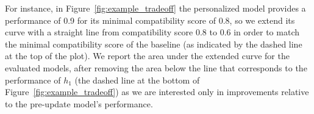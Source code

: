 \documentclass[letterpaper]{article} %
\theoremstyle{definition}
\begin{document}
For instance, in  Figure~\ref{fig:example_tradeoff} the personalized model provides a performance of 0.9 for its minimal compatibility score of 0.8, so we extend its curve with a straight line from compatibility score 0.8 to 0.6 in order to match the minimal compatibility score of the baseline (as indicated by the dashed line at the top of the plot). We report the area under the extended curve for the evaluated models, after removing the area below the line that corresponds to the performance of $h_1$ (the dashed line at the bottom of Figure~\ref{fig:example_tradeoff}) as we are interested only in improvements relative to the pre-update model's performance.



 
 

%


\end{document}
